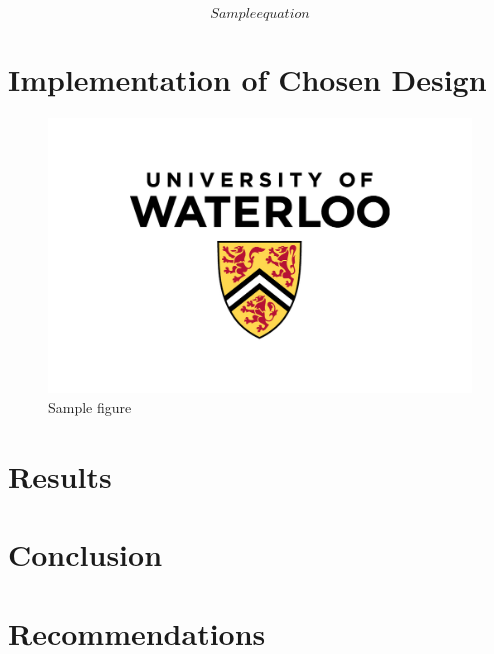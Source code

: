 \documentclass[letterpaper,12pt]{article}
\begin{document}
\begin{equation}
\label{eq:equation}
Sample equation
\end{equation}

\section{Implementation of Chosen Design}

\begin{figure}[H]
\centering \includegraphics[width=0.8\columnwidth]{UW.jpg}
\caption{\label{fig:figure}Sample figure}
\end{figure}
\pagebreak

\section{Results}

\section{Conclusion}

\section{Recommendations}

\pagebreak
\end{document}
